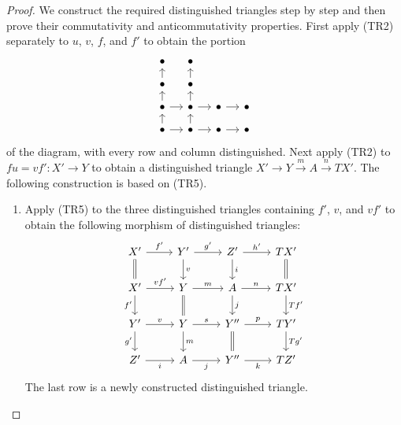\begin{proof}
	We construct the required distinguished triangles step by step and then
	prove their commutativity and anticommutativity properties. First apply
	(TR2) separately to $u$, $v$, $f$, and $f'$ to obtain the portion
	\[\begin{tikzcd}[row sep=small, column sep=small]
		\bullet & \bullet & & \\
		\bullet \arrow[u] & \bullet \arrow[u] & & \\
		\bullet \arrow[r] \arrow[u] & \bullet \arrow[r] \arrow[u] & \bullet \arrow[r] & \bullet \\
		\bullet \arrow[r] \arrow[u] & \bullet \arrow[u] \arrow[r] & \bullet \arrow[r] & \bullet
	\end{tikzcd}\]
	of the diagram, with every row and column distinguished. Next apply (TR2)
	to $fu = vf' : X' \to Y$ to obtain a distinguished triangle
	$X' \to Y \xrightarrow{m} A \xrightarrow{n} TX'$. The following
	construction is based on (TR5).

	\begin{enumerate}
		\item Apply (TR5) to the three distinguished triangles containing
		$f'$, $v$, and $vf'$ to obtain the following morphism of
		distinguished triangles:
		\begin{equation}\label{eqn:triangulated-9-diag-aux-0}\begin{tikzcd}
			X' \arrow[r, "{f'}"] \arrow[equal, d] & Y' \arrow[r, "{g'}"] \arrow[d, "v"] & Z' \arrow[r, "{h'}"] \arrow[d, "i"] & TX' \arrow[equal, d] \\
			X' \arrow[r, "{vf'}"] \arrow[d, "{f'}"'] & Y \arrow[r, "m"] \arrow[equal, d] & A \arrow[r, "n"] \arrow[d, "j"] & TX' \arrow[d, "{Tf'}"] \\
			Y' \arrow[r, "v"] \arrow[d, "{g'}"'] & Y \arrow[r, "s"] \arrow[d, "m"] & Y'' \arrow[r, "p"] \arrow[equal, d] & TY' \arrow[d, "{Tg'}"] \\
			Z' \arrow[r, "i"'] & A \arrow[r, "j"'] & Y'' \arrow[r, "k"'] & TZ'
		\end{tikzcd}\end{equation}
		The last row is a newly constructed distinguished triangle.


\end{enumerate}
\end{proof}
